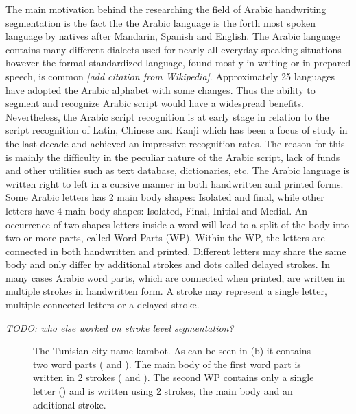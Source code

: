 \documentclass[journal,compsoc]{IEEEtran}
\begin{document}
The main motivation behind the researching the field of Arabic handwriting segmentation is the fact the the Arabic language is the forth most spoken language by natives after Mandarin, Spanish and English. The Arabic language contains many different dialects used for nearly all everyday speaking situations however the formal standardized language, found mostly in writing or in prepared speech, is common \emph{[add citation from Wikipedia]}.  Approximately 25 languages have adopted the Arabic alphabet with some changes. Thus the ability to segment and recognize Arabic script would have a widespread benefits. Nevertheless, the Arabic script recognition is at early stage in relation to the script recognition of Latin, Chinese and Kanji which has been a focus of study in the last decade and achieved an impressive recognition rates. The reason for this is mainly the difficulty in the peculiar nature of the Arabic script, lack of funds and other utilities such as text database, dictionaries, etc. \cite{zeki2011segmentation}
The Arabic language is written right to left in a cursive manner in both handwritten and printed forms. Some Arabic letters has 2 main body shapes: Isolated and final, while other letters have 4 main body shapes: Isolated, Final, Initial and Medial. An occurrence of two shapes letters inside a word will lead to a split of the body into two or more parts, called Word-Parts (WP). Within the WP, the letters are connected in both handwritten and printed. Different letters may share the same body and only differ by additional strokes and dots called delayed strokes. In many cases Arabic word parts, which are connected when printed, are written in multiple strokes in handwritten form. A stroke may represent a single letter, multiple connected letters or a delayed stroke.

\emph{TODO: who else worked on stroke level segmentation?}
 
 
 
\begin{figure}[h]
\centering
    \caption{The Tunisian city name kambot. As can be seen in (b) it contains two word parts ( and  ). The main body of the first word part is written in 2 strokes ( and ). The second WP contains only a single letter () and is written using 2 strokes, the main body and an additional stroke.   
     }
   \label{fig:kmbot}
\end{figure}
\end{document}
